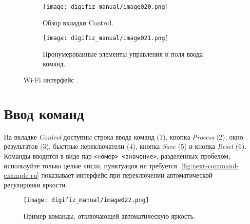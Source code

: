 \begin{figure}[htbp]
    \centering
    \begin{subfigure}{0.48\textwidth}
        \texttt{[image: digifiz\_manual/image020.png]}
        \caption{Обзор вкладки Control.}
    \end{subfigure}\hfill
    \begin{subfigure}{0.48\textwidth}
        \texttt{[image: digifiz\_manual/image021.png]}
        \caption{Пронумерованные элементы управления и поля ввода команд.}
    \end{subfigure}
    \caption{Wi-Fi интерфейс \ReplicaNextShort{}.}
    \label{fig:next-control-tabs-ru}
\end{figure}

\section{Ввод команд}
На вкладке \emph{Control} доступны строка ввода команд (1), кнопка \emph{Process} (2), окно результатов (3), быстрые переключатели (4), кнопка \emph{Save} (5) и кнопка \emph{Reset} (6).
Команды вводятся в виде пар \verb|<номер> <значение>|, разделённых пробелом; используйте только целые числа, пунктуация не требуется.
\autoref{fig:next-command-example-ru} показывает интерфейс при переключении автоматической регулировки яркости.

\begin{figure}[htbp]
    \centering
    \texttt{[image: digifiz\_manual/image022.png]}
    \caption{Пример команды, отключающей автоматическую яркость.}
    \label{fig:next-command-example-ru}
\end{figure}

